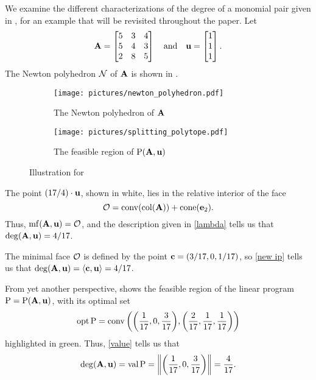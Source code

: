 \documentclass{article}
\begin{document}
\begin{example}
   \label{ex: ft}
   We examine the different characterizations of the degree of a monomial pair given in , for an example that will be revisited throughout the paper.
   Let
   \[\mathbf{A}=\begin{bmatrix}5&3&4\\ 5&4&3\\ 2&8&5\end{bmatrix} \quad \text{and} \quad \mathbf{u} =
      \begin{bmatrix} 1 \\ 1\\ 1 \end{bmatrix}.\]
   The Newton polyhedron $\mathcal{N}$ of $\mathbf{A}$ is shown in .
   \begin{figure}
   \centering
   \begin{subfigure}{.48\textwidth}
      \centering
      \texttt{[image: pictures/newton\_polyhedron.pdf]}\\[1.4mm]
      \caption{The Newton polyhedron of $\mathbf{A}$}
      \label{fig: newton polyhedron}
   \end{subfigure}
   \begin{subfigure}{.48\textwidth}
      \centering
      \texttt{[image: pictures/splitting\_polytope.pdf]}
      \caption{The feasible region of $\mathrm{P}(\mathbf{A},\mathbf{u})$}
      \label{fig: splitting polytope}
   \end{subfigure}
      \caption{Illustration for }
   \label{fig: newton polyhedron and splitting polytope}
   \end{figure}
   The point $(17/4)\cdot \mathbf{u}$, shown in white, lies in the relative interior of the face
   \[\mathcal{O} = \operatorname{conv}(\operatorname{col}(\mathbf{A})) + \operatorname{cone}(\mathbf{e}_2).\]
   Thus, $\operatorname{mf}(\mathbf{A},\mathbf{u}) = \mathcal{O}$, and the description given in \ref{lambda} tells us that $\operatorname{deg}(\mathbf{A},\mathbf{u}) = 4/17$.

   The minimal face $\mathcal{O}$ is defined by the point $\mathbf{c} = (3/17, 0, 1/17)$, so \ref{new ip} tells us that
   $\operatorname{deg}(\mathbf{A},\mathbf{u}) = \langle \mathbf{c}, \mathbf{u} \rangle = 4/17$.

   From yet another perspective,  shows the feasible region of the linear program $\mathrm{P} = \mathrm{P}(\mathbf{A},\mathbf{u})$, with its optimal set
   \[\operatorname{opt} \mathrm{P} = \operatorname{conv}\bigg(\bigg(\frac1{17}, 0, \frac3{17}\bigg),\bigg(\frac2{17}, \frac1{17}, \frac1{17}\bigg)\bigg)\]
   highlighted in green.
   Thus, \ref{value} tells us that
   \[\operatorname{deg}(\mathbf{A},\mathbf{u}) = \operatorname{val} \mathrm{P} = \bigg\|\bigg(\frac1{17}, 0, \frac3{17}\bigg)\bigg\| = \frac4{17}.\]
\end{example}
\end{document}
